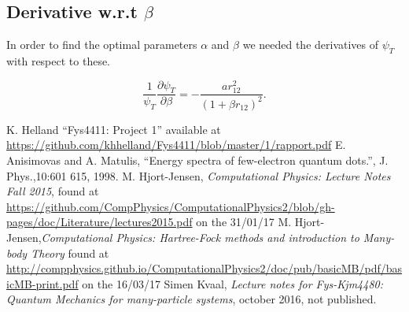 \documentclass[a4paper,norsk,10pt]{article}
\newcommand{\p}{\partial}
\newcommand{\pddt}[2]{\frac{\p #1}{\p #2}}
\newcommand{\f}{\frac}
\begin{document}
\subsection{Derivative w.r.t \(\beta\)}
In order to find the optimal parameters \(\alpha\) and \(\beta\) we needed the derivatives of \(\psi_T\) with respect to these.

\[  \f{1}{\psi_T}\pddt{\psi_T}{\beta} = -\f{ar_{12}^2}{(1+\beta r_{12})^2}.\]





\begin{thebibliography}{1}

  K. Helland ``Fys4411: Project 1'' available at \url{https://github.com/khhelland/Fys4411/blob/master/1/rapport.pdf}
  E. Anisimovas and A. Matulis, ``Energy spectra of few-electron quantum dots.'', J. Phys.,10:601 615, 1998.
  M. Hjort-Jensen, \emph{Computational Physics: Lecture Notes Fall 2015}, found at
  \url{https://github.com/CompPhysics/ComputationalPhysics2/blob/gh-pages/doc/Literature/lectures2015.pdf}
  on the 31/01/17
  M. Hjort-Jensen,\emph{Computational Physics: Hartree-Fock methods and introduction to Many-body Theory}
  found at \url{http://compphysics.github.io/ComputationalPhysics2/doc/pub/basicMB/pdf/basicMB-print.pdf}
  on the 16/03/17
  Simen Kvaal, \emph{Lecture notes for Fys-Kjm4480: Quantum Mechanics for many-particle systems},
  october 2016, not published.
\end{thebibliography}


      
      




\end{document}
